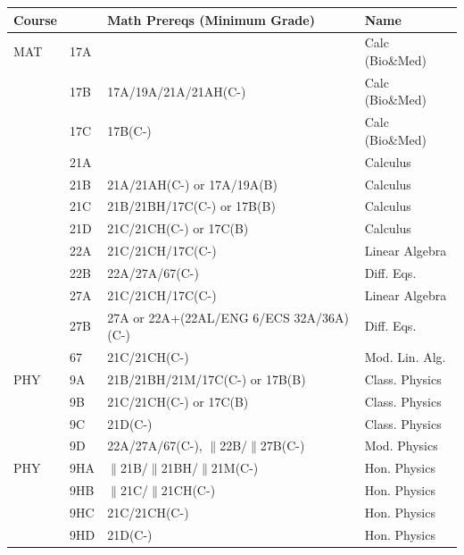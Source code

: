 \documentclass[12pt]{article}
\begin{document}
\vskip 2cm
\label{tbl:math-prereqs}
\begin{center}
\begin{tabular}{|llll|}
\hline
Course & & Math Prereqs (Minimum Grade)& Name \\
\hline
MAT & 17A &                      & Calc (Bio\&Med)\\
    & 17B & 17A/19A/21A/21AH(C-) & Calc (Bio\&Med)\\
    & 17C & 17B(C-)              & Calc (Bio\&Med)\\
    & 21A &                      & Calculus \\
    & 21B & 21A/21AH(C-) or 17A/19A(B) & Calculus \\
    & 21C & 21B/21BH/17C(C-) or 17B(B) & Calculus\\
    & 21D & 21C/21CH(C-) or 17C(B)     & Calculus \\
    & 22A & 21C/21CH/17C(C-)           & Linear Algebra \\
    & 22B & 22A/27A/67(C-)             & Diff. Eqs. \\
    & 27A & 21C/21CH/17C(C-)           & Linear Algebra \\
    & 27B & 27A or 22A+(22AL/ENG 6/ECS 32A/36A)(C-) & Diff. Eqs. \\
    & 67  & 21C/21CH(C-)               & Mod. Lin. Alg. \\
\hline
\hline
PHY & 9A & 21B/21BH/21M/17C(C-) or 17B(B) & Class. Physics\\
    & 9B & 21C/21CH(C-) or 17C(B) & Class. Physics\\
    & 9C & 21D(C-) & Class. Physics\\
    & 9D & 22A/27A/67(C-), $\parallel$22B/$\parallel$27B(C-) & Mod. Physics\\
\hline
\hline
PHY & 9HA & $\parallel$21B/$\parallel$21BH/$\parallel$21M(C-) & Hon. Physics\\
    & 9HB    & $\parallel$21C/$\parallel$21CH(C-) & Hon. Physics \\
    & 9HC    & 21C/21CH(C-) & Hon. Physics \\
    & 9HD    & 21D(C-)  & Hon. Physics \\
\hline
\end{tabular}
\end{center}
\end{document}
